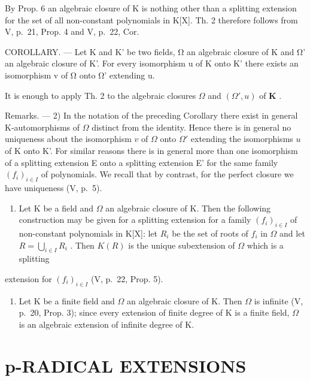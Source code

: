 By Prop. 6 an algebraic closure of K is nothing other than a splitting extension for the set of all non-constant polynomials in K{[}X{]}. Th. 2 therefore follows from V, p.~21, Prop. 4 and V, p.~22, Cor.

COROLLARY. --- Let K and K' be two fields, Ω an algebraic closure of K and Ω' an algebraic closure of K'. For every isomorphism u of K onto K' there exists an isomorphism v of Ω onto Ω' extending u.

It is enough to apply Th. 2 to the algebraic closures \(\Omega\) and \((\Omega', u)\) of \(\mathbf{K}\) .

Remarks. --- 2) In the notation of the preceding Corollary there exist in general K-automorphisms of \(\Omega\) distinct from the identity. Hence there is in general no uniqueness about the isomorphism \(v\) of \(\Omega\) onto \(\Omega'\) extending the isomorphisms \(u\) of K onto K'. For similar reasons there is in general more than one isomorphism of a splitting extension E onto a splitting extension E' for the same family \((f_i)_{i \in I}\) of polynomials. We recall that by contrast, for the perfect closure we have uniqueness (V, p.~5).

\begin{enumerate}
\def\labelenumi{\arabic{enumi})}
\setcounter{enumi}{2}
\tightlist
\item
  Let K be a field and \(\Omega\) an algebraic closure of K. Then the following construction may be given for a splitting extension for a family \((f_{i})_{i\in I}\) of non-constant polynomials in K{[}X{]}: let \(R_{i}\) be the set of roots of \(f_{i}\) in \(\Omega\) and let \(R=\bigcup_{i\in I}R_{i}\) . Then \(K(R)\) is the unique subextension of \(\Omega\) which is a splitting
\end{enumerate}

extension for \((f_i)_{i\in I}\) (V, p.~22, Prop. 5).

\begin{enumerate}
\def\labelenumi{\arabic{enumi})}
\setcounter{enumi}{3}
\tightlist
\item
  Let K be a finite field and \(\Omega\) an algebraic closure of K. Then \(\Omega\) is infinite (V, p.~20, Prop. 3); since every extension of finite degree of K is a finite field, \(\Omega\) is an algebraic extension of infinite degree of K.
\end{enumerate}

\section{p-RADICAL EXTENSIONS}


